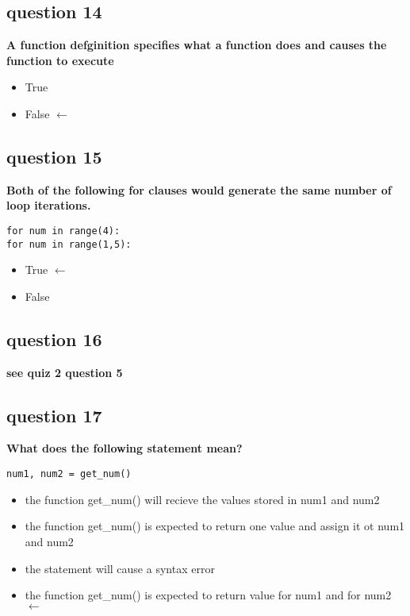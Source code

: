 \documentclass[10pt]{article}
\begin{document}
\subsection*{question 14}
\textbf{A function defginition specifies what a function does and causes the function to execute}
\begin{itemize}
\item True
\item False $\leftarrow$
\end{itemize}
\subsection*{question 15}
\textbf{Both of the following for clauses would generate the same number of loop iterations.}
\begin{verbatim}
for num in range(4):
for num in range(1,5):
\end{verbatim}
\begin{itemize}
\item True $\leftarrow$
\item False
\end{itemize}
\subsection*{question 16}
\textbf{see quiz 2 question 5}
\subsection*{question 17}
\textbf{What does the following statement mean?}
\begin{verbatim}
num1, num2 = get_num()
\end{verbatim}
\begin{itemize}
\item the function get\_num()  will recieve the values stored in num1 and num2
\item the function get\_num() is expected to return one value and assign it ot num1 and num2
\item the statement will cause a syntax error
\item the function get\_num() is expected to return value for num1 and for num2 $\leftarrow$
\end{itemize}
\end{document}
